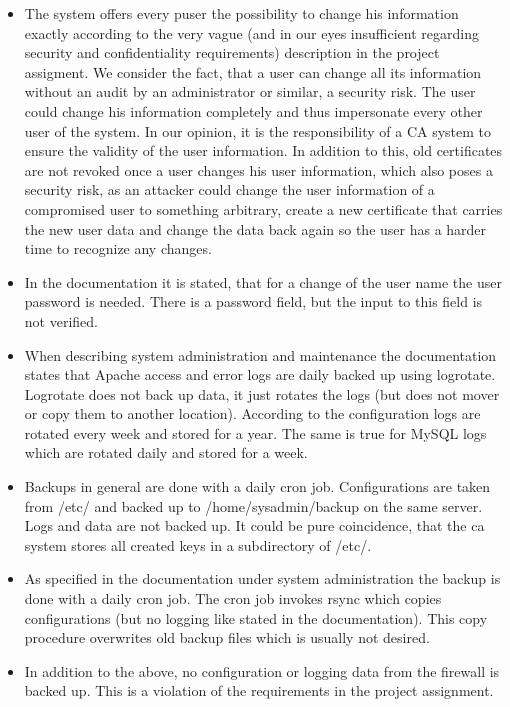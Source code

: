 \documentclass{article}
\begin{document}
\begin{itemize}
\item The system offers every puser the possibility to change his information exactly according to the very vague (and in our eyes insufficient regarding security and confidentiality requirements) description in the project assigment. We consider the fact, that a user can change all its information without an audit by an administrator or similar, a security risk. The user could change his information completely and thus impersonate every other user of the system. In our opinion, it is the responsibility of a CA system to ensure the validity of the user information. In addition to this, old certificates are not revoked once a user changes his user information, which also poses a security risk, as an attacker could change the user information of a compromised user to something arbitrary, create a new certificate that carries the new user data and change the data back again so the user has a harder time to recognize any changes.

\item In the documentation it is stated, that for a change of the user name the user password is needed. There is a password field, but the input to this field is not verified.

\item When describing system administration and maintenance the documentation states that Apache access and error logs are daily backed up using logrotate. Logrotate does not back up data, it just rotates the logs (but does not mover or copy them to another location). According to the configuration logs are rotated every week and stored for a year. The same is true for MySQL logs which are rotated daily and stored for a week.

\item Backups in general are done with a daily cron job. Configurations are taken from /etc/ and backed up to /home/sysadmin/backup on the same server. Logs and data are not backed up. It could be pure coincidence, that the ca system stores all created keys in a subdirectory of /etc/.

\item As specified in the documentation under system administration the backup is done with a daily cron job. The cron job invokes rsync which copies configurations (but no logging like stated in the documentation). This copy procedure overwrites old backup files which is usually not desired.

\item In addition to the above, no configuration or logging data from the firewall is backed up. This is a violation of the requirements in the project assignment.


\end{itemize}
\end{document}
